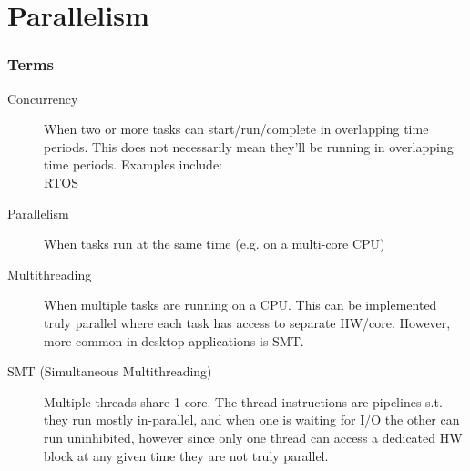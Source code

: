 \documentclass{article}
\begin{document}
      \part{Parallelism}
\section{Terms}
    \begin{description}
      \item[Concurrency]
        When two or more tasks can start/run/complete in overlapping time periods. This does not necessarily mean they'll be running in overlapping time periods. Examples include: \\ RTOS
    \end{description}
    \begin{description}
      \item[Parallelism]
        When tasks run at the same time (e.g. on a multi-core CPU)
    \end{description}
    \begin{description}
      \item[Multithreading]
        When multiple tasks are running on a CPU. This can be implemented truly parallel where each task has access to separate HW/core. However, more common in desktop applications is SMT.
    \end{description}
    \begin{description}
      \item[SMT (Simultaneous Multithreading)]
        Multiple threads share 1 core. The thread instructions are pipelines s.t. they run mostly in-parallel, and when one is waiting for I/O the other can run uninhibited, however since only one thread can access a dedicated HW block at any given time they are not truly parallel.
    \end{description}
\end{document}
